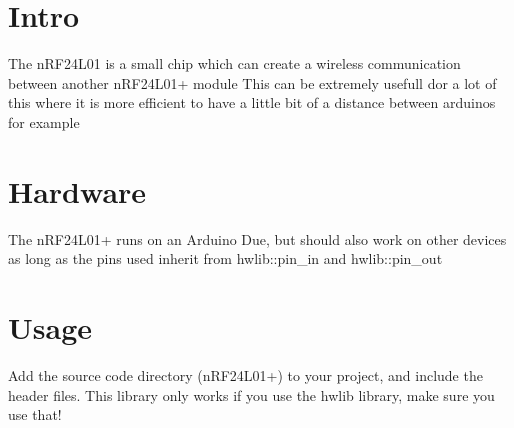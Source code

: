 \hypertarget{index_Intro}{}\section{Intro}\label{index_Intro}
The n\+R\+F24\+L01 is a small chip which can create a wireless communication between another n\+R\+F24\+L01+ module This can be extremely usefull dor a lot of this where it is more efficient to have a little bit of a distance between arduino\textquotesingle{}s for example\hypertarget{index_Hardware}{}\section{Hardware}\label{index_Hardware}
The n\+R\+F24\+L01+ runs on an Arduino Due, but should also work on other devices as long as the pins used inherit from hwlib\+::pin\+\_\+in and hwlib\+::pin\+\_\+out\hypertarget{index_Usage}{}\section{Usage}\label{index_Usage}
Add the source code directory (n\+R\+F24\+L01+) to your project, and include the header files. This library only works if you use the hwlib library, make sure you use that! 